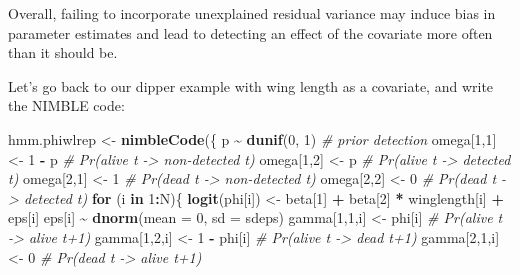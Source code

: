 \documentclass[
  12pt,
]{krantz}
\newenvironment{Shaded}{\begin{snugshade}}{\end{snugshade}}
\newcommand{\AttributeTok}[1]{\textcolor[rgb]{0.13,0.29,0.53}{#1}}
\newcommand{\CommentTok}[1]{\textcolor[rgb]{0.56,0.35,0.01}{\textit{#1}}}
\newcommand{\ControlFlowTok}[1]{\textcolor[rgb]{0.13,0.29,0.53}{\textbf{#1}}}
\newcommand{\DecValTok}[1]{\textcolor[rgb]{0.00,0.00,0.81}{#1}}
\newcommand{\FunctionTok}[1]{\textcolor[rgb]{0.13,0.29,0.53}{\textbf{#1}}}
\newcommand{\NormalTok}[1]{#1}
\newcommand{\OtherTok}[1]{\textcolor[rgb]{0.56,0.35,0.01}{#1}}
\newcommand{\SpecialCharTok}[1]{\textcolor[rgb]{0.81,0.36,0.00}{\textbf{#1}}}
\begin{document}
Overall, failing to incorporate unexplained residual variance may induce bias in parameter estimates and lead to detecting an effect of the covariate more often than it should be.

Let's go back to our dipper example with wing length as a covariate, and write the NIMBLE code:

\begin{Shaded}
\begin{Highlighting}[]
\NormalTok{hmm.phiwlrep }\OtherTok{\textless{}{-}} \FunctionTok{nimbleCode}\NormalTok{(\{}
\NormalTok{    p }\SpecialCharTok{\textasciitilde{}} \FunctionTok{dunif}\NormalTok{(}\DecValTok{0}\NormalTok{, }\DecValTok{1}\NormalTok{) }\CommentTok{\# prior detection}
\NormalTok{    omega[}\DecValTok{1}\NormalTok{,}\DecValTok{1}\NormalTok{] }\OtherTok{\textless{}{-}} \DecValTok{1} \SpecialCharTok{{-}}\NormalTok{ p    }\CommentTok{\# Pr(alive t {-}\textgreater{} non{-}detected t)}
\NormalTok{    omega[}\DecValTok{1}\NormalTok{,}\DecValTok{2}\NormalTok{] }\OtherTok{\textless{}{-}}\NormalTok{ p        }\CommentTok{\# Pr(alive t {-}\textgreater{} detected t)}
\NormalTok{    omega[}\DecValTok{2}\NormalTok{,}\DecValTok{1}\NormalTok{] }\OtherTok{\textless{}{-}} \DecValTok{1}        \CommentTok{\# Pr(dead t {-}\textgreater{} non{-}detected t)}
\NormalTok{    omega[}\DecValTok{2}\NormalTok{,}\DecValTok{2}\NormalTok{] }\OtherTok{\textless{}{-}} \DecValTok{0}        \CommentTok{\# Pr(dead t {-}\textgreater{} detected t)}
  \ControlFlowTok{for}\NormalTok{ (i }\ControlFlowTok{in} \DecValTok{1}\SpecialCharTok{:}\NormalTok{N)\{}
    \FunctionTok{logit}\NormalTok{(phi[i]) }\OtherTok{\textless{}{-}}\NormalTok{ beta[}\DecValTok{1}\NormalTok{] }\SpecialCharTok{+}\NormalTok{ beta[}\DecValTok{2}\NormalTok{] }\SpecialCharTok{*}\NormalTok{ winglength[i] }\SpecialCharTok{+}\NormalTok{ eps[i]}
\NormalTok{    eps[i] }\SpecialCharTok{\textasciitilde{}} \FunctionTok{dnorm}\NormalTok{(}\AttributeTok{mean =} \DecValTok{0}\NormalTok{, }\AttributeTok{sd =}\NormalTok{ sdeps)}
\NormalTok{    gamma[}\DecValTok{1}\NormalTok{,}\DecValTok{1}\NormalTok{,i] }\OtherTok{\textless{}{-}}\NormalTok{ phi[i]      }\CommentTok{\# Pr(alive t {-}\textgreater{} alive t+1)}
\NormalTok{    gamma[}\DecValTok{1}\NormalTok{,}\DecValTok{2}\NormalTok{,i] }\OtherTok{\textless{}{-}} \DecValTok{1} \SpecialCharTok{{-}}\NormalTok{ phi[i]  }\CommentTok{\# Pr(alive t {-}\textgreater{} dead t+1)}
\NormalTok{    gamma[}\DecValTok{2}\NormalTok{,}\DecValTok{1}\NormalTok{,i] }\OtherTok{\textless{}{-}} \DecValTok{0}           \CommentTok{\# Pr(dead t {-}\textgreater{} alive t+1)}

\end{Highlighting}
\end{Shaded}
\end{document}
